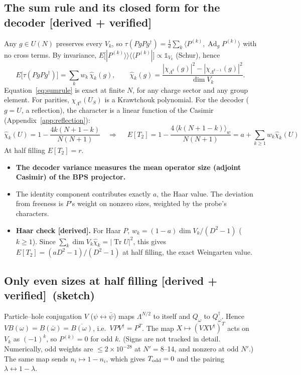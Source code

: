 \documentclass[11pt]{article}
\newcommand{\Tr}{\operatorname{Tr}}
\newcommand{\Np}{N'}
\newcommand{\one}{\mathds 1}
\newcommand{\Ad}{\operatorname{Ad}}
\newcommand{\tagbox}[2]{\textsf{\small\color{#1}[#2]}}
\newcommand{\DER}{\tagbox{cder}{derived}}
\newcommand{\VER}{\tagbox{cder}{derived + verified}}
\theoremstyle{remark}
\begin{document}
\subsection{The sum rule and its closed form for the decoder \VER}
Any $g\in U(N)$ preserves every $V_k$, so $\tau(PgPg^\dagger)=\frac1d\sum_k\langle P^{(k)},\Ad_gP^{(k)}\rangle$ with no
cross terms. By invariance, $E\big[|P^{(k)}\rangle\rangle\langle\langle P^{(k)}|\big]\propto\one_{V_k}$ (Schur), hence
\begin{equation}
E\big[\tau(PgPg^\dagger)\big]=\sum_kw_k\,\hat\chi_k(g),\qquad \hat\chi_k(g)=\frac{|\chi_{\Lambda^k}(g)|^2-|\chi_{\Lambda^{k-1}}(g)|^2}{\dim V_k}.
\label{eq:sumrule}
\end{equation}
Equation~\eqref{eq:sumrule} is exact at finite $N$, for any charge sector and any group element. For parities,
$\chi_{\Lambda^k}(U_S)$ is a Krawtchouk polynomial. For the decoder ($g=U$, a reflection), the character is a linear
function of the Casimir (Appendix~\ref{app:reflection}):
\begin{equation}
\hat\chi_k(U)=1-\frac{4k(N+1-k)}{N(N+1)}\quad\Longrightarrow\quad
\boxed{\;E[T_2]=1-\frac{4\,\langle k(N+1-k)\rangle_w}{N(N+1)}=a+\sum_{k\ge1}w_k\hat\chi_k(U)\;}
\label{eq:rsize}
\end{equation}
At half filling $E[T_2]=r$.
\begin{itemize}\itemsep1pt
\item \textbf{The decoder variance measures the mean operator size (adjoint Casimir) of the BPS projector.}
\item The identity component contributes exactly $a$, the Haar value. The deviation from freeness is $P$'s weight on
  nonzero sizes, weighted by the probe's characters.
\item \textbf{Haar check \DER.} For Haar $P$, $w_k=(1-a)\dim V_k/(D^2-1)$ ($k\ge1$). Since
  $\sum_k\dim V_k\hat\chi_k=|\Tr U|^2$, this gives $E[T_2]=(aD^2-1)/(D^2-1)$ at half filling, the exact Weingarten
  value.
\end{itemize}

\subsection{Only even sizes at half filling \VER\ (sketch)}\label{sec:even}
Particle--hole conjugation $V$ ($\psi\leftrightarrow\bar\psi$) maps $\Lambda^{N/2}$ to itself and $Q_\omega$ to
$Q_{\bar\omega}^\dagger$. Hence $VB(\omega)=B(\bar\omega)=\overline{B(\omega)}$, i.e.\ $VPV^\dagger=P^T$. The map
$X\mapsto(VXV^\dagger)^T$ acts on $V_k$ as $(-1)^k$, so $P^{(k)}=0$ for odd $k$. (Signs are not tracked in detail.
Numerically, odd weights are $\le2\times10^{-28}$ at $\Np=8$--14, and nonzero at odd $\Np$.) The same map sends
$n_i\mapsto1-n_i$, which gives $T_{\rm odd}=0$ and the pairing $\lambda\leftrightarrow1-\lambda$.
\end{document}
